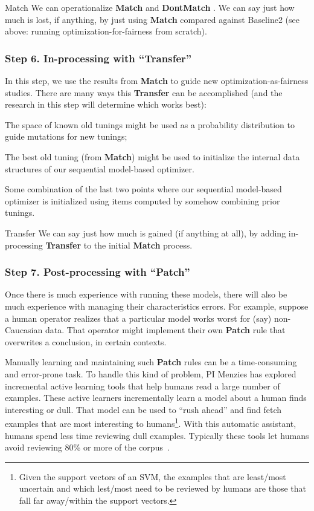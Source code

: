 \begin{success}{Match}
 We can operationalize
{\bf Match}  and {\bf DontMatch} .
We can say  just how much
is lost, if anything,  by just using {\bf Match}   compared against  Baseline2 (see above:
running optimization-for-fairness from scratch).  
\end{success}


\subsubsection{Step 6. In-processing with ``Transfer''}
In this step, we  use the results from
{\bf Match}  to guide new optimization-as-fairness studies. 
There are many ways this {\bf Transfer}  can be accomplished
(and the research in this step will determine which works best):
\bi
\item
The space of known old tunings might be used as a probability
distribution to guide mutations for new tunings;
\item
The best old tuning (from {\bf Match}) might be used to initialize 
the internal data structures of our sequential model-based optimizer.  
\item
Some combination of the last two points where 
 our sequential model-based optimizer is initialized using
 items computed by somehow combining prior tunings.
\ei

\begin{success}{Transfer}
We can say  just how much
is gained (if anything at all),
by adding in-processing {\bf Transfer} to the initial
{\bf Match} process.  
\end{success}

\subsubsection{Step 7. Post-processing with ``Patch''}
Once there is much experience with running these models, there will also be much experience
with managing their characteristics errors.
For example, suppose a human
operator realizes that a particular model works worst for (say) non-Caucasian data. That operator might
implement their own {\bf Patch} rule that overwrites a conclusion, in certain contexts.  

Manually learning and maintaining such {\bf Patch}  rules can be a time-consuming and error-prone task.
To handle this kind of problem, PI Menzies has explored incremental
active learning tools\cite{Yu2018,Yu20} that help humans read a large number of examples. These active learners
incrementally learn a model about a human finds interesting or dull. That model can be used to
``rush ahead'' and find fetch examples that are most interesting to humans\footnote{Given
the support vectors of an SVM, the examples that are least/most uncertain and which 
lest/most need to be reviewed
by humans are those that fall far away/within the support vectors.}. 
With this automatic assistant,  humans spend less
time reviewing dull examples. Typically these tools let humans avoid reviewing 80\% or more of the corpus~\cite{Yu2018,Yu20}.

